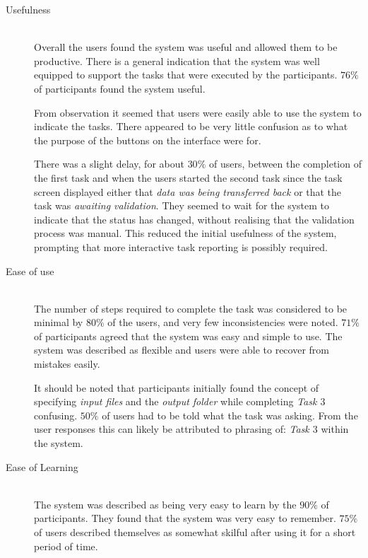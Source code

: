 \documentclass[12pt,a4paper]{report}
\begin{document}
\begin{description}
    \item[Usefulness] \hfill \\
    	Overall the users found the system was useful and allowed them to be
    	productive. There is a general indication that the system was well
    	equipped to support the tasks that were executed by the participants.
	$76\%$ of participants found the system useful.

    	From observation it seemed that users were easily able to use the system
    	to indicate the tasks. There appeared to be very little confusion as to
    	what the purpose of the buttons on the interface were for.

    	There was a slight delay, for about $30\%$ of users, between the
	completion of the first task and
    	when the users started the second task since the task screen displayed
    	either that \emph{data was being transferred back} or that the task
    	was \emph{awaiting validation}. They seemed to wait for the system to
    	indicate that the status has changed, without realising that the
    	validation process was manual. This reduced the initial usefulness of
    	the system, prompting that more interactive task reporting is possibly
    	required.
    \item[Ease of use] \hfill \\
    	The number of steps required to complete the task was considered to be
    	minimal by $80\%$ of the users, and very few inconsistencies were
	noted. $71\%$ of participants agreed that the system was easy
	and simple to
    	use. The system was described as flexible and users were able to
    	recover from mistakes easily.

    	It should be noted that participants initially found the concept of
    	specifying \emph{input files} and the \emph{output folder} while
    	completing \emph{Task $3$} confusing. $50\%$ of users had to be told
    	what the task was asking. From the user responses this can likely be
    	attributed to phrasing of: \emph{Task $3$} within the system.

    \item[Ease of Learning] \hfill \\
        The system was described as being very easy to learn by the $90\%$ of
    	participants. They found that the system was very easy to remember.
    	$75\%$ of users described themselves as somewhat skilful after using
	it for a short	period of time.


\end{description}
\end{document}
